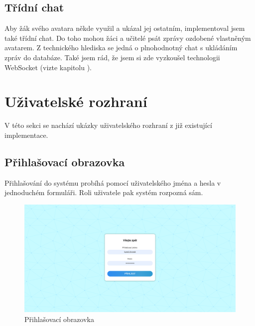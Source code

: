 \documentclass[twoside]{ctuthesis}
\theoremstyle{plain}
\theoremstyle{definition}
\theoremstyle{note}
\begin{document}
\section{Třídní chat}
Aby žák svého avatara někde využil a ukázal jej ostatním, implementoval jsem také třídní chat. Do toho mohou žáci a učitelé psát zprávy ozdobené vlastněným avatarem. Z technického hlediska se jedná o plnohodnotný chat s ukládáním zpráv do databáze. Také jsem rád, že jsem si zde vyzkoušel technologii WebSocket (vizte kapitolu ).

\chapter{Uživatelské rozhraní}
V této sekci se nachází ukázky uživatelského rozhraní z již existující implementace.

\section{Přihlašovací obrazovka}
Přihlašování do systému probíhá pomocí uživatelského jména a hesla v jednoduchém formuláři. Roli uživatele pak systém rozpozná sám.
\begin{figure}[H]
    \caption{Přihlašovací obrazovka}
    \centering
    \includegraphics[width=\textwidth]{images/app_screenshots/login}
\end{figure}
\end{document}
